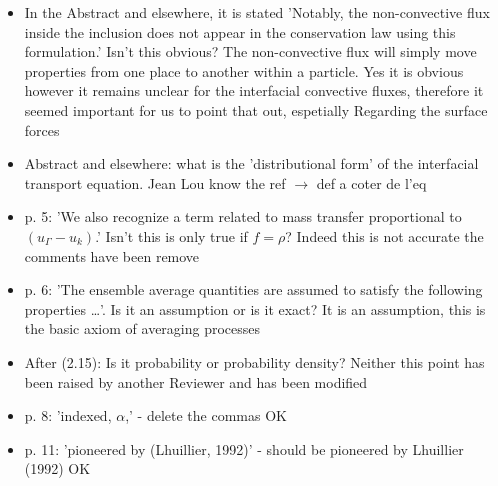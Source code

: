 \documentclass[10pt,a4paper]{article}
\newcommand{\tb}[1]{\color{blue}#1\color{black}}
\newcommand{\tr}[1]{\color{red}#1\color{black}}
\begin{document}
\begin{itemize}
    \item In the Abstract and elsewhere, it is stated 'Notably, the non-convective flux inside the inclusion does not appear in the conservation law using this formulation.' Isn't this obvious?
    The non-convective flux will simply move properties from one place to another within a particle.
    \tb{Yes it is obvious however it remains unclear for the interfacial convective fluxes, therefore it seemed important for us to point that out,  espetially Regarding the surface forces}
    \item Abstract and elsewhere: what is the 'distributional form' of the interfacial transport equation.
    \tr{ Jean Lou know the ref $\to$ def a coter de l'eq}
    \item p. 5: 'We also recognize a term related to mass transfer proportional to $(u_\Gamma - u_k)$.' Isn't this is only true if $f = \rho$?
    \tb{Indeed this is not accurate the comments have been remove}
    \item p. 6: 'The ensemble average quantities are assumed to satisfy the following properties …'. Is it an assumption or is it exact?
    \tb{It is an assumption, this is the basic axiom of averaging processes}
    \item After (2.15): Is it probability or probability density?
    \tb{Neither this point has been raised by another Reviewer and has been modified}
    \item  p. 8: 'indexed, $\alpha$,' - delete the commas
    \tb{OK}
    \item  p. 11: 'pioneered by (Lhuillier, 1992)' - should be pioneered by Lhuillier (1992)
    \tb{OK}
\end{itemize}
\end{document}
